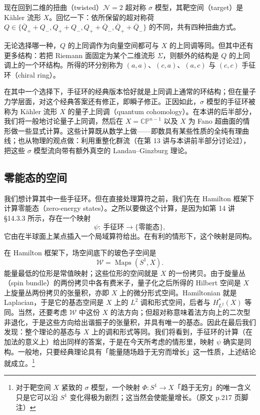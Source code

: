 现在回到二维的扭曲（twisted）$\mathcal{N}=2$ 超对称 $\sigma$ 模型，其靶空间（target）是 Kähler 流形 $X$。回忆一下：依所保留的超对称荷 $Q\in\{\overline{Q}_+ + Q_-,Q_+ + Q_-,Q_+ + \overline{Q}_-,\overline{Q}_+ + \overline{Q}_-\}$ 的不同，共有四种扭曲方式。


无论选择哪一种，$Q$ 的上同调作为向量空间都可与 $X$ 的上同调等同。但其中还有更多结构：若把 Riemann 面固定为某个二维流形 $\Sigma$，则额外的结构是 $Q$ 的上同调上的一个环结构。所得的环分别称为 $(a,a)$、$(c,a)$、$(a,c)$ 与 $(c,c)$ 手征环（chiral ring）。

在其中一个选择下，手征环的经典版本恰好就是上同调上通常的环结构；但在量子力学层面，对这个经典答案还有修正，即瞬子修正。正因如此，$\sigma$ 模型的手征环被称为 Kähler 流形 $X$ 的量子上同调（quantum cohomology）。在本讲的后半部分，我们将一般地讨论量子上同调，然后在 $X=\mathbb{CP}^{n-1}$ 以及 $X$ 为 Fano 超曲面的情形做一些显式计算。这些计算既从数学上做——即数具有某些性质的全纯有理曲线；也从物理的观点做：利用重整化群流（在第 13 讲与本讲前半部分讨论过），把这些 $\sigma$ 模型流向带有额外真空的 Landau--Ginzburg 理论。

\subsection{零能态的空间}

我们想计算其中一些手征环。但在直接处理算符之前，我们先在 Hamilton 框架下计算零能态（zero-energy states）。之所以要做这个计算，是因为如第 14 讲 §14.3.3 所示，存在一个映射
\[
  \psi:\ \text{手征环}\longrightarrow\{\text{零能态}\},
\]
它由在半球面上某点插入一个局域算符给出。在有利的情形下，这个映射是同构。


在 Hamilton 框架下，场空间底下的玻色子空间是
\[
  \mathcal{W}=\operatorname{Maps}(S^1,X).
\]
能量最低的位形是常值映射；这些位形的空间就是 $X$ 的一份拷贝。由于旋量丛（spin bundle）的两份拷贝中各有费米子，量子化之后所得的 Hilbert 空间是 $X$ 上旋量丛两份拷贝的张量积，亦即 $X$ 上的微分形式空间。Hamiltonian 就是 Laplacian，于是它的基态空间是 $X$ 上的 $L^2$ 调和形式空间，后者与 $H^*_{L^2}(X)$ 等同。当然，还要考虑 $\mathcal{W}$ 中这份 $X$ 的法方向；但超对称意味着法方向上的二次型非退化，于是这些方向给出谐振子的张量积，并具有唯一的基态。因此在最后我们发现：整个理论的基态与 $X$ 上的调和形式等同。我们将看到，手征环的计算（在加法的意义上）给出同样的答案，于是在今天所考虑的情形里，映射 $\psi$ 确实是同构。一般地，只要经典理论具有「能量随场趋于无穷而增长」这一性质，上述结论就成立。\footnote{对于靶空间 $X$ 紧致的 $\sigma$ 模型，一个映射 $\Phi:S^1\to X$「趋于无穷」的唯一含义只是它可以沿 $S^1$ 变化得极为剧烈；这当然会使能量增长。（原文 p.217 页脚注）}


